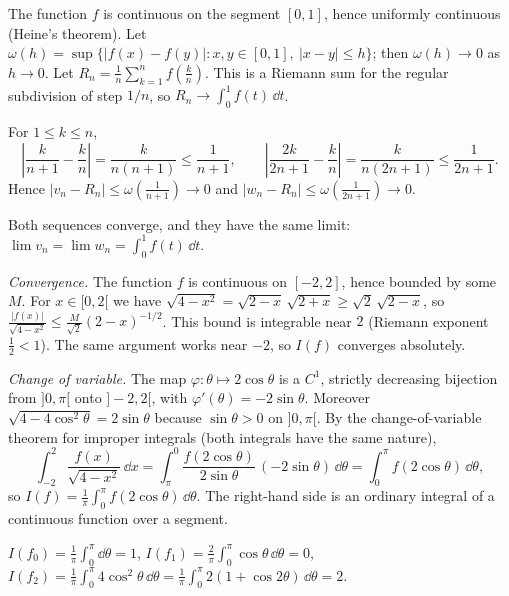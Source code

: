 \documentclass[11pt,a4paper]{article}
\begin{document}

The function $f$ is continuous on the segment $[0,1]$, hence uniformly continuous
(Heine's theorem). Let
$\omega(h) = \sup\{|f(x)-f(y)| : x,y\in[0,1],\ |x-y|\le h\}$; then $\omega(h) \to 0$ as
$h \to 0$. Let $R_n = \frac1n\sum_{k=1}^n f\!\left(\frac kn\right)$. This is a Riemann sum
for the regular subdivision of step $1/n$, so $R_n \to \int_0^1 f(t)\,\dd t$.

For $1 \le k \le n$,
\[
  \left|\frac{k}{n+1} - \frac kn\right| = \frac{k}{n(n+1)} \le \frac{1}{n+1},
  \qquad
  \left|\frac{2k}{2n+1} - \frac kn\right| = \frac{k}{n(2n+1)} \le \frac{1}{2n+1}.
\]
Hence $|v_n - R_n| \le \omega\!\left(\frac1{n+1}\right) \to 0$ and
$|w_n - R_n| \le \omega\!\left(\frac1{2n+1}\right) \to 0$.
\begin{result}
Both sequences converge, and they have the same limit:
$\displaystyle\lim v_n = \lim w_n = \int_0^1 f(t)\,\dd t$.
\end{result}

\emph{Convergence.} The function $f$ is continuous on $[-2,2]$, hence bounded by some $M$.
For $x \in [0,2[$ we have
$\sqrt{4-x^2} = \sqrt{2-x}\,\sqrt{2+x} \ge \sqrt2\,\sqrt{2-x}$, so
$\frac{|f(x)|}{\sqrt{4-x^2}} \le \frac{M}{\sqrt2}(2-x)^{-1/2}$. This bound is integrable near
$2$ (Riemann exponent $\frac12 < 1$). The same argument works near $-2$, so $I(f)$ converges
absolutely.

\emph{Change of variable.} The map $\varphi : \theta \mapsto 2\cos\theta$ is a $C^1$,
strictly decreasing bijection from $]0,\pi[$ onto $]-2,2[$, with
$\varphi'(\theta) = -2\sin\theta$. Moreover $\sqrt{4-4\cos^2\theta} = 2\sin\theta$ because
$\sin\theta > 0$ on $]0,\pi[$. By the change-of-variable theorem for improper integrals (both
integrals have the same nature),
\[
  \int_{-2}^{2}\frac{f(x)}{\sqrt{4-x^2}}\,\dd x
  = \int_{\pi}^{0}\frac{f(2\cos\theta)}{2\sin\theta}\,(-2\sin\theta)\,\dd\theta
  = \int_0^\pi f(2\cos\theta)\,\dd\theta,
\]
so $I(f) = \frac1\pi\int_0^\pi f(2\cos\theta)\,\dd\theta$. The right-hand side is an ordinary
integral of a continuous function over a segment.

$I(f_0) = \frac1\pi\int_0^\pi\dd\theta = 1$, \quad
$I(f_1) = \frac2\pi\int_0^\pi\cos\theta\,\dd\theta = 0$, \quad
$I(f_2) = \frac1\pi\int_0^\pi 4\cos^2\theta\,\dd\theta
        = \frac1\pi\int_0^\pi 2(1+\cos2\theta)\,\dd\theta = 2$.
\end{document}
